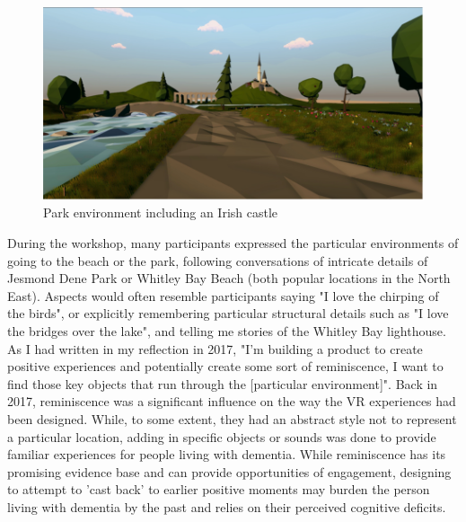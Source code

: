 \begin{figure}
\centering
\includegraphics[width=.8\linewidth]{Images/IrishCastlVR.png}
\caption{Park environment including an Irish castle}
\label{fig:IrishCastle}
\end{figure}

During the workshop, many participants expressed the particular environments of going to the beach or the park, following conversations of intricate details of Jesmond Dene Park or Whitley Bay Beach (both popular locations in the North East). Aspects would often resemble participants saying "I love the chirping of the birds", or explicitly remembering particular structural details such as "I love the bridges over the lake", and telling me stories of the Whitley Bay lighthouse. As I had written in my reflection in 2017, "I'm building a product to create positive experiences and potentially create some sort of reminiscence, I want to find those key objects that run through the [particular environment]". Back in 2017, reminiscence was a significant influence on the way the VR experiences had been designed. While, to some extent, they had an abstract style not to represent a particular location, adding in specific objects or sounds was done to provide familiar experiences for people living with dementia. While reminiscence has its promising evidence base and can provide opportunities of engagement, designing to attempt to 'cast back' to earlier positive moments may burden the person living with dementia by the past and relies on their perceived cognitive deficits. 

